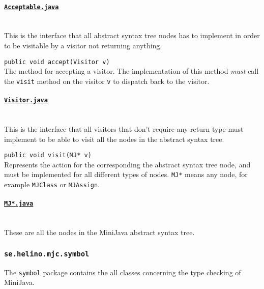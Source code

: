 \documentclass[11pt,oneside,a4paper]{article}
\newcommand{\code}[1]{\texttt{#1}}
\newcommand{\class}[1]{\underline{\texttt{#1}}}
\begin{document}
\paragraph{\class{Acceptable.java}} \hfill \\
This is the interface that all abstract syntax tree nodes has to implement in
order to be visitable by a visitor not returning anything.
\begin{description}
    \item{\code{public void accept(Visitor v)}} \hfill \\
        The method for accepting a visitor. The implementation of this method 
        \emph{must} call the
        \code{visit} method on the visitor \code{v} to dispatch back to the
        visitor. 
\end{description}


\paragraph{\class{Visitor.java}} \hfill \\
This is the interface that all visitors that don't require any return type
must implement to be able to visit all the nodes in the abstract syntax tree.
\begin{description}
    \item{\code{public void visit(MJ* v)}} \hfill \\
        Represents the action for the corresponding the abstract
        syntax tree node, and must be implemented for all different types of 
        nodes.  \code{MJ*} means any node, for example \code{MJClass} or
        \code{MJAssign}.
\end{description}

\paragraph{\class{MJ*.java}} \hfill \\
These are all the nodes in the MiniJava abstract syntax tree.

\subsubsection{\code{se.helino.mjc.symbol}}
The \code{symbol} package contains the all classes concerning the type
checking of MiniJava.
\end{document}
